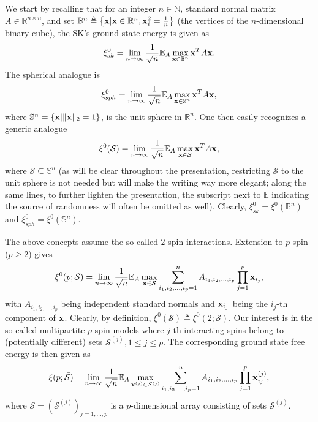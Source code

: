 \documentclass[10pt]{article}
\def\x{{\bf x}}
\def\x{{\mathbf x}}
\def\x{{\bf x}}
\def\x{{\bf x}}
\def\mR{{\mathbb R}}
\def\mN{{\mathbb N}}
\def\mE{{\mathbb E}}
\def\mS{{\mathbb S}}
\def\mB{{\mathbb B}}
\def\lp{\left (}
\def\rp{\right )}
\def\x{{\bf x}}
\def\x{{\mathbf x}}
\def\x{{\bf x}}
\def\x{{\bf x}}
\def\cS{{\mathcal S}}
\def\bcS{\bar{\mathcal S}}
\begin{document}
We start by recalling that for an integer $n\in\mN$, standard normal matrix $A\in\mR^{n\times n}$, and set $\mB^n \triangleq \left \{ \x| \x\in\mR^n, \x_i^2=\frac{1}{n}\right \}$ (the vertices of the $n$-dimensional binary cube),  the SK's ground state energy is given as
\begin{eqnarray}\label{eq:inteq1}
\xi^0_{sk} = \lim_{n\rightarrow\infty} \frac{1}{\sqrt{n}}\mE_A \max_{\x\in\mB^n} \x^TA\x.
\end{eqnarray}
The spherical analogue is
\begin{eqnarray}\label{eq:inteq1a}
\xi^0_{sph} = \lim_{n\rightarrow\infty} \frac{1}{\sqrt{n}}\mE_A \max_{\x\in\mS^n} \x^TA\x,
\end{eqnarray}
where $\mS^n=\{\x|\|\x\|_2=1\}$, is the unit sphere in $\mR^n$. One then easily recognizes a generic analogue
\begin{eqnarray}\label{eq:inteq1b}
\xi^0(\cS) = \lim_{n\rightarrow\infty} \frac{1}{\sqrt{n}}\mE_A \max_{\x\in\cS} \x^TA\x,
\end{eqnarray}
where $\cS\subseteq\mS^n$ (as will be clear throughout the presentation, restricting $\cS$ to the unit sphere is not needed but will make the writing way more elegant; along the same lines, to further lighten the presentation, the subscript next to $\mE$ indicating the source of randomness will often be omitted as well). Clearly, $\xi^0_{sk}=\xi^0(\mB^n)$ and $\xi^0_{sph}=\xi^0(\mS^n)$.

The above concepts assume the so-called $2$-spin interactions. Extension to $p$-spin ($p\geq 2$) gives
\begin{eqnarray}\label{eq:inteq1b}
\xi^0(p;\cS) = \lim_{n\rightarrow\infty} \frac{1}{\sqrt{n}}\mE_A \max_{\x\in\cS} \sum_{i_1,i_2,\dots,i_p=1}^n A_{i_1,i_2,\dots,i_p}\prod_{j=1}^{p}\x_{i_j},
\end{eqnarray}
with $A_{i_1,i_2,\dots,i_p}$  being independent standard normals and $\x_{i_j}$ being the $i_j$-th component of $\x$. Clearly, by definition, $\xi^0(\cS)\triangleq \xi^0(2;\cS)$. Our interest is in the so-called multipartite $p$-spin models where $j$-th interacting spins belong to (potentially different) sets  $\cS^{(j)},1\leq j\leq p$. The corresponding ground state free energy is then given as
\begin{eqnarray}\label{eq:inteq1c}
\xi(p;\bcS) = \lim_{n\rightarrow\infty} \frac{1}{\sqrt{n}}\mE_A \max_{\x^{(j)}\in\cS^{(j)}} \sum_{i_1,i_2,\dots,i_p=1}^n A_{i_1,i_2,\dots,i_p}\prod_{j=1}^{p}\x_{i_j}^{(j)},
\end{eqnarray}
where $\bcS=\lp \cS^{(j)}\rp_{j=1,\dots,p}$ is a $p$-dimensional array consisting of sets $\cS^{(j)}$.
\end{document}
